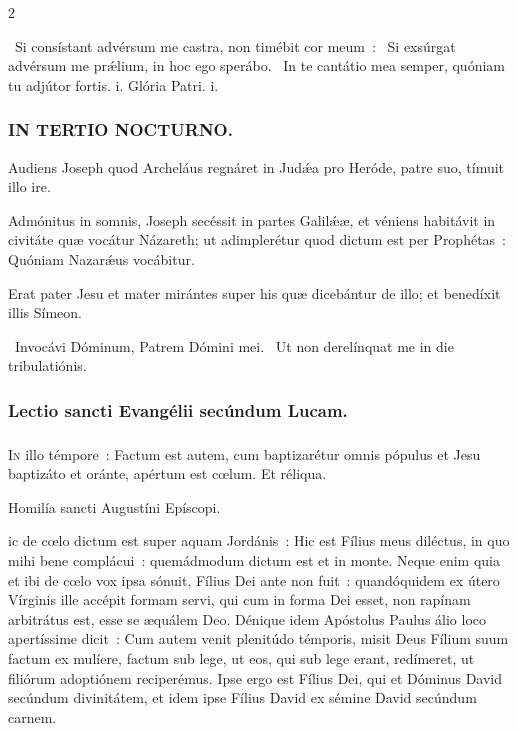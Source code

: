 \documentclass[9pt,twoside]{extarticle}
\begin{document}
\begin{multicols}{2}
{\begin{tightlist}{}
\item {}~Si consístant advérsum me castra, non timébit cor meum~: \textred{*}~Si exsúrgat advérsum me prǽlium, in hoc ego sperábo. ~In te cantátio mea semper, quóniam tu adjútor fortis. i. Glória Patri. i.
\end{tightlist}

\subsubsection*{\center \textsc{IN TERTIO NOCTURNO.}}
\begin{tightlist}{}
\item {} Audiens Joseph quod Archeláus regnáret in Judǽa pro Heróde, patre suo, tímuit illo ire.
\item {} Admónitus in somnis, Joseph secéssit in partes Galilǽæ, et véniens habitávit in civitáte quæ vocátur Názareth; ut adimplerétur quod dictum est per Prophétas~: Quóniam Nazarǽus vocábitur.
\item {} Erat pater Jesu et mater mirántes super his quæ dicebántur de illo; et benedíxit illis Símeon.
\item {}~Invocávi Dóminum, Patrem Dómini mei. ~Ut non derelínquat me in die tribulatiónis.
\end{tightlist}

\subsubsection*{\center Lectio sancti Evangélii secúndum Lucam.}
\subsubsection*{\center {}}
\lettrine{I}n illo témpore~: Factum est autem, cum baptizarétur omnis pópulus et Jesu baptizáto et oránte, apértum est cœlum. Et réliqua.

\begin{center}Homilía sancti Augustíni Epíscopi.\\
\end{center}
ic de cœlo dictum est super aquam Jordánis~: Hic est Fílius meus diléctus, in quo mihi bene complácui~: quemádmodum dictum est et in monte. Neque enim quia et ibi de cœlo vox ipsa sónuit, Fílius Dei ante non fuit~: quandóquidem ex útero Vírginis ille accépit formam servi, qui cum in forma Dei esset, non rapínam arbitrátus est, esse se æquálem Deo. Dénique idem Apóstolus Paulus álio loco apertíssime dicit~: Cum autem venit plenitúdo témporis, misit Deus Fílium suum factum ex mulíere, factum sub lege, ut eos, qui sub lege erant, redímeret, ut filiórum adoptiónem reciperémus. Ipse ergo est Fílius Dei, qui et Dóminus David secúndum divinitátem, et idem ipse Fílius David ex sémine David secúndum carnem.

}
\end{multicols}
\end{document}
